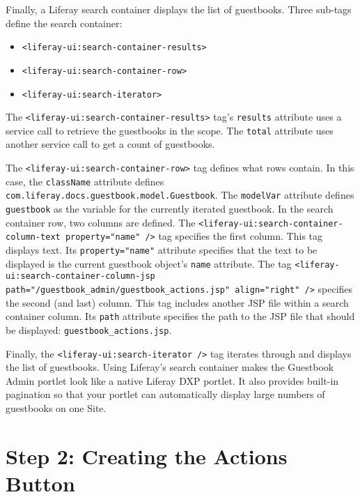 Finally, a Liferay search container displays the list of guestbooks.
Three sub-tags define the search container:

\begin{itemize}
\tightlist
\item
  \texttt{\textless{}liferay-ui:search-container-results\textgreater{}}
\item
  \texttt{\textless{}liferay-ui:search-container-row\textgreater{}}
\item
  \texttt{\textless{}liferay-ui:search-iterator\textgreater{}}
\end{itemize}

The
\texttt{\textless{}liferay-ui:search-container-results\textgreater{}}
tag's \texttt{results} attribute uses a service call to retrieve the
guestbooks in the scope. The \texttt{total} attribute uses another
service call to get a count of guestbooks.

The \texttt{\textless{}liferay-ui:search-container-row\textgreater{}}
tag defines what rows contain. In this case, the \texttt{className}
attribute defines \texttt{com.liferay.docs.guestbook.model.Guestbook}.
The \texttt{modelVar} attribute defines \texttt{guestbook} as the
variable for the currently iterated guestbook. In the search container
row, two columns are defined. The
\texttt{\textless{}liferay-ui:search-container-column-text\ property="name"\ /\textgreater{}}
tag specifies the first column. This tag displays text. Its
\texttt{property="name"} attribute specifies that the text to be
displayed is the current guestbook object's \texttt{name} attribute. The
tag \texttt{\textless{}liferay-ui:search-container-column-jsp}
\texttt{path="/guestbook\_admin/guestbook\_actions.jsp"\ align="right"\ /\textgreater{}}
specifies the second (and last) column. This tag includes another JSP
file within a search container column. Its \texttt{path} attribute
specifies the path to the JSP file that should be displayed:
\texttt{guestbook\_actions.jsp}.

Finally, the
\texttt{\textless{}liferay-ui:search-iterator\ /\textgreater{}} tag
iterates through and displays the list of guestbooks. Using Liferay's
search container makes the Guestbook Admin portlet look like a native
Liferay DXP portlet. It also provides built-in pagination so that your
portlet can automatically display large numbers of guestbooks on one
Site.

\section{Step 2: Creating the Actions
Button}\label{step-2-creating-the-actions-button}

